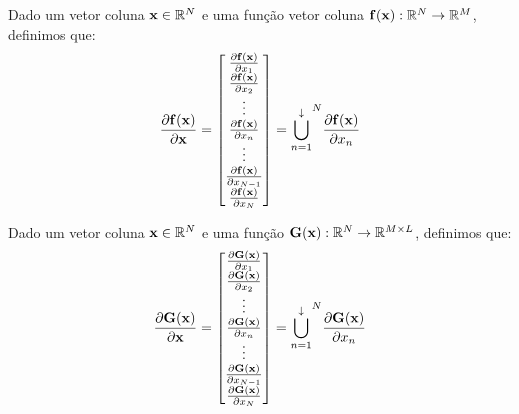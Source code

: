 \begin{definition}\label{def:deltaver2}
Dado 
um vetor coluna $\VECTOR{x}\in \mathbb{R}^N$ e 
uma função vetor coluna $\VECTOR{f}(\VECTOR{x}): \mathbb{R}^N \rightarrow \mathbb{R}^M$, 
definimos que:
\begin{equation}
\frac{\partial \VECTOR{f}(\VECTOR{x}) }{\partial \VECTOR{x}}= 
\left[
\begin{matrix}
\frac{\partial \VECTOR{f}(\VECTOR{x}) }{\partial x_{1}} \\
\frac{\partial \VECTOR{f}(\VECTOR{x}) }{\partial x_{2}} \\
\vdots \\
\frac{\partial \VECTOR{f}(\VECTOR{x}) }{\partial x_{n}} \\
\vdots \\
\frac{\partial \VECTOR{f}(\VECTOR{x}) }{\partial x_{N-1}} \\
\frac{\partial \VECTOR{f}(\VECTOR{x}) }{\partial x_{N}}
\end{matrix}
\right] =  
{\bigcup\limits_{n=1}^{\downarrow}}^{N}{\frac{\partial \VECTOR{f}(\VECTOR{x}) }{\partial x_{n}}}
\end{equation}
\end{definition}

\begin{definition}\label{def:deltaver3}
Dado 
um vetor coluna $\VECTOR{x}\in \mathbb{R}^N$ e 
uma função $\MATRIX{G}(\VECTOR{x}): \mathbb{R}^N \rightarrow \mathbb{R}^{M\times L}$, 
definimos que:
\begin{equation}
\frac{\partial \MATRIX{G}(\VECTOR{x}) }{\partial \VECTOR{x}}= 
\left[
\begin{matrix}
\frac{\partial \MATRIX{G}(\VECTOR{x}) }{\partial x_{1}} \\
\frac{\partial \MATRIX{G}(\VECTOR{x}) }{\partial x_{2}} \\
\vdots \\
\frac{\partial \MATRIX{G}(\VECTOR{x}) }{\partial x_{n}} \\
\vdots \\
\frac{\partial \MATRIX{G}(\VECTOR{x}) }{\partial x_{N-1}} \\
\frac{\partial \MATRIX{G}(\VECTOR{x}) }{\partial x_{N}}
\end{matrix}
\right] = {\bigcup\limits_{n=1}^{\downarrow}}^{N}{\frac{\partial \MATRIX{G}(\VECTOR{x}) }{\partial x_{n}}}
\end{equation}
\end{definition}

